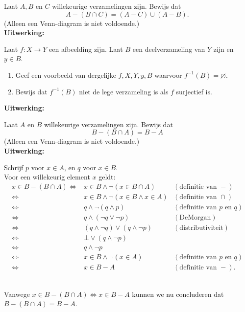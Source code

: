 \begin{answer}
Laat $A, B$ en $C$ willekeurige verzamelingen zijn. Bewijs dat
$$A-(B\cap C)=(A-C)\cup(A-B).$$
(Alleen een Venn-diagram is niet voldoende.)\\[2.5pt]

\noindent\textbf{Uitwerking:}
\end{answer}

\begin{answer}
Laat $f:X\rightarrow Y$ een afbeelding zijn. Laat $B$ een deelverzameling van $Y$ zijn en $y\in B$.
\begin{enumerate}[label=\alph*.]
    \item Geef een voorbeeld van dergelijke $f, X, Y, y, B$ waarvoor $f^{-1}(B)=\varnothing$.
    \item Bewijs dat $f^{-1}(B)$ niet de lege verzameling is als $f$ surjectief is.
\end{enumerate}

\noindent\textbf{Uitwerking:}
\end{answer}

\begin{answer}
Laat $A$ en $B$ willekeurige verzamelingen zijn. Bewijs dat
$$B-(B\cap A)=B-A$$
(Alleen een Venn-diagram is niet voldoende.)\\[2.5pt]

\noindent\textbf{Uitwerking:}\\
\indent\begin{minipage}{0.9\textwidth}
Schrijf $p$ voor $x\in A$, en $q$ voor $x\in B$.\\[1.5pt]
Voor een willekeurig element $x$ geldt:
$$\begin{array}{rll}
     x\in B-(B\cap A)\Leftrightarrow & x\in B\wedge\neg(x\in B\cap A)&(\text{definitie van }-)\\
     \Leftrightarrow & x\in B\wedge\neg(x\in B\wedge x\in A)&(\text{definitie van }\cap)\\
     \Leftrightarrow & q\wedge\neg(q\wedge p) & (\text{definitie van $p$ en $q$})\\
     \Leftrightarrow & q\wedge(\neg q\vee \neg p) & (\text{DeMorgan})\\
     \Leftrightarrow & (q\wedge\neg q)\vee(q\wedge\neg p) & (\text{distributiviteit})\\
     \Leftrightarrow & \bot\vee(q\wedge\neg p) &\\
     \Leftrightarrow & q\wedge\neg p & \\
     \Leftrightarrow & x\in B\wedge\neg(x\in A) & (\text{definitie van $p$ en $q$})\\
     \Leftrightarrow & x\in B-A & (\text{definitie van }-).
\end{array}$$
\end{minipage}\\
Vanwege $x\in B-(B\cap A)\Leftrightarrow x\in B-A$ kunnen we nu concluderen dat $B-(B\cap A)=B-A$.
\end{answer}

